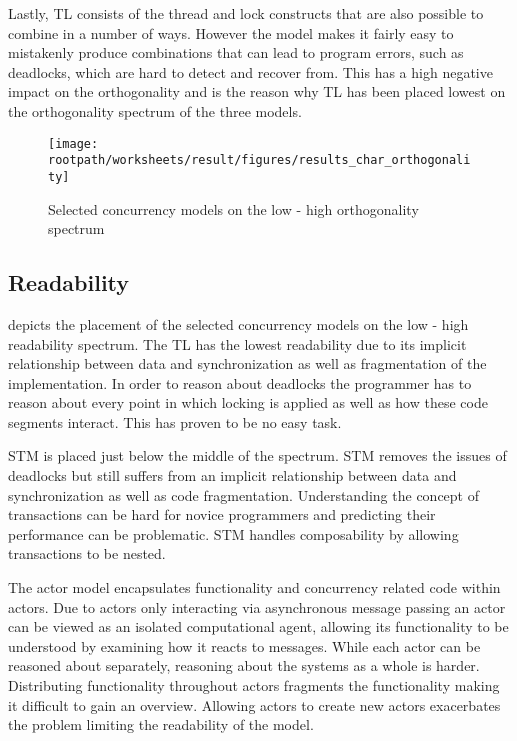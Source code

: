 Lastly, \ac{TL} consists of the thread and lock constructs that are also possible to combine in a number of ways. However the model makes it fairly easy to mistakenly produce combinations that can lead to program errors, such as deadlocks, which are hard to detect and recover from. This has a high negative impact on the orthogonality and is the reason why \ac{TL} has been placed lowest on the orthogonality spectrum of the three models.

\begin{figure}[htbp]
\centering
 \texttt{[image: \\rootpath/worksheets/result/figures/results\_char\_orthogonality]} 
 \caption{Selected concurrency models on the low - high orthogonality spectrum}
\label{fig:results_char_orthogonality}
\end{figure}

\subsection{Readability}\label{sec:result_char_readability}
 depicts the placement of the selected concurrency models on the low - high readability spectrum. The \ac{TL} has the lowest readability due to its implicit relationship between data and synchronization as well as fragmentation of the implementation. In order to reason about deadlocks the programmer has to reason about every point in which locking is applied as well as how these code segments interact. This has proven to be no easy task.

\ac{STM} is placed just below the middle of the spectrum. \ac{STM} removes the issues of deadlocks but still suffers from an implicit relationship between data and synchronization as well as code fragmentation. Understanding the concept of transactions can be hard for novice programmers and predicting their performance can be problematic. \ac{STM} handles composability by allowing transactions to be nested. 

The actor model encapsulates functionality and concurrency related code within actors. Due to actors only interacting via asynchronous message passing an actor can be viewed as an isolated computational agent, allowing its functionality to be understood by examining how it reacts to messages. While each actor can be reasoned about separately, reasoning about the systems as a whole is harder. Distributing functionality throughout actors fragments the functionality making it difficult to gain an overview. Allowing actors to create new actors exacerbates the problem limiting the readability of the model.

